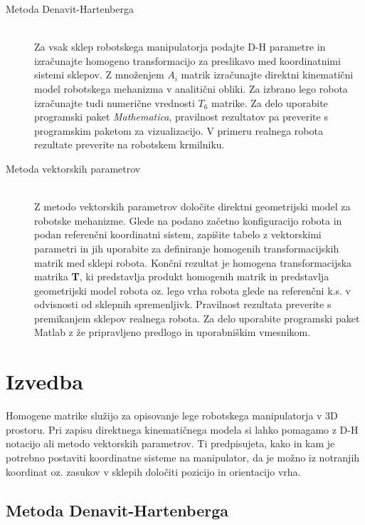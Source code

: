 \begin{description}

\item[Metoda Denavit-Hartenberga] \hfill \\ Za vsak sklep robotskega
manipulatorja podajte D-H parametre in izračunajte homogeno transformacijo za
preslikavo med koordinatnimi sistemi sklepov. Z množenjem $A_i$ matrik
izračunajte direktni kinematični model robotskega mehanizma v analitični
obliki. Za izbrano lego robota izračunajte tudi numerične vrednosti $T_6$
matrike. Za delo uporabite programski paket \emph{Mathematica}, pravilnost
rezultatov pa preverite s programskim paketom za vizualizacijo. V primeru
realnega robota rezultate preverite na robotskem krmilniku.

\item[Metoda vektorskih parametrov] \hfill \\
Z metodo vektorskih parametrov določite direktni geometrijski model
za robotske mehanizme. Glede na podano začetno konfiguracijo robota in podan referenčni koordinatni sistem, zapišite tabelo z vektorskimi parametri in jih uporabite za definiranje homogenih transformacijskih matrik med sklepi robota. Končni rezultat je homogena transformacijska matrika \textbf{T}, ki predstavlja produkt homogenih matrik in predstavlja geometrijski model robota oz. lego vrha robota glede na referenčni k.s. v odvisnosti od sklepnih spremenljivk. Pravilnost rezultata preverite s premikanjem sklepov realnega robota. Za delo uporabite programski paket Matlab z že pripravljeno predlogo in uporabniškim vmesnikom.

\end{description}

\section{Izvedba}

Homogene matrike služijo za opisovanje lege robotskega manipulatorja v 3D
prostoru. Pri zapisu direktnega kinematičnega modela si lahko pomagamo z D-H
notacijo ali metodo vektorskih parametrov. Ti predpisujeta, kako in kam je potrebno postaviti koordinatne sisteme
na manipulator, da je možno iz notranjih koordinat oz. zasukov v sklepih
določiti pozicijo in orientacijo vrha.

\subsection{Metoda Denavit-Hartenberga}

